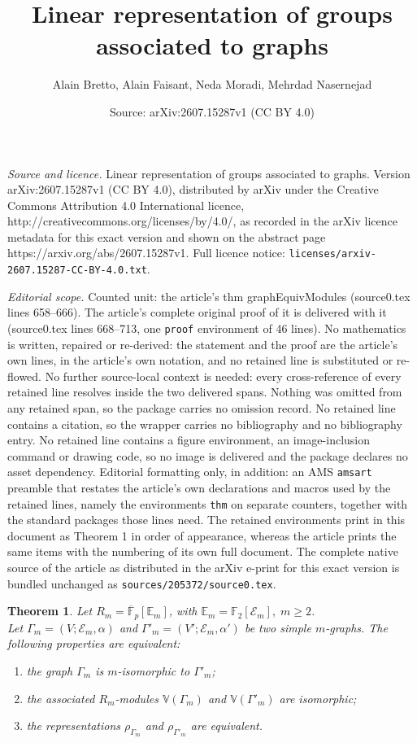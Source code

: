 \documentclass[10pt,a4paper]{amsart}
\title{Linear representation of groups associated to graphs}
\author{Alain Bretto, Alain Faisant, Neda Moradi, Mehrdad Nasernejad}
\date{Source: arXiv:2607.15287v1 (CC BY 4.0)}
\newtheorem{thm}{Theorem}
\begin{document}
\maketitle

\noindent\emph{Source and licence.} Linear representation of groups associated to graphs. Version arXiv:2607.15287v1 (CC BY 4.0), distributed by arXiv under the Creative Commons Attribution 4.0 International licence, http://creativecommons.org/licenses/by/4.0/, as recorded in the arXiv licence metadata for this exact version and shown on the abstract page https://arxiv.org/abs/2607.15287v1. Full licence notice: \texttt{licenses/arxiv-2607.15287-CC-BY-4.0.txt}.\par\smallskip

\noindent\textit{Editorial scope.} Counted unit: the article's thm graphEquivModules (source0.tex lines 658--666). The article's complete original proof of it is delivered with it (source0.tex lines 668--713, one \texttt{proof} environment of 46 lines). No mathematics is written, repaired or re-derived: the statement and the proof are the article's own lines, in the article's own notation, and no retained line is substituted or re-flowed.  No further source-local context is needed: every cross-reference of every retained line resolves inside the two delivered spans.  Nothing was omitted from any retained span, so the package carries no omission record.  No retained line contains a citation, so the wrapper carries no bibliography and no bibliography entry.  No retained line contains a figure environment, an image-inclusion command or drawing code, so no image is delivered and the package declares no asset dependency.  Editorial formatting only, in addition: an AMS \texttt{amsart} preamble that restates the article's own declarations and macros used by the retained lines, namely the environments \texttt{thm} on separate counters, together with the standard packages those lines need.  The retained environments print in this document as Theorem 1 in order of appearance, whereas the article prints the same items with the numbering of its own full document.  The complete native source of the article as distributed in the arXiv e-print for this exact version is bundled unchanged as \texttt{sources/205372/source0.tex}.
\begin{thm} \label{graphEquivModules}
Let $R_m=\overline{\mathbb{F}}_p[\mathbb{E}_m]$, with  $\mathbb{E}_m=\mathbb{F}_2[\mathcal{E}_m], \; m \ge 2$.\\
 Let  $\Gamma_m=(V;\mathcal{E}_m, \alpha)$ and $\Gamma'_m=(V'; \mathcal{E}_m, \alpha')$ be two simple $m$-graphs. The following properties are equivalent:
\begin{enumerate}
\item[i)] the graph $\Gamma_m$ is $m$-isomorphic to  $\Gamma'_m$;
\item[ii)] the associated $R_m$-modules ${\displaystyle \mathbb{V}(\Gamma_m)}$ and ${\displaystyle \mathbb{V}(\Gamma'_m)}$ are isomorphic;
\item[iii)]  the representations $ \rho_{\Gamma_m}$ and $\rho_{\Gamma'_m}$  are equivalent.
\end{enumerate}
\end{thm}
\end{document}
